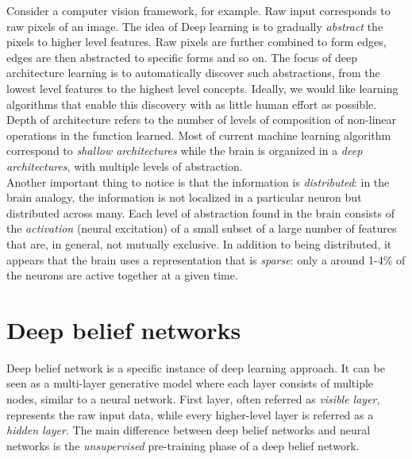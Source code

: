 Consider a computer vision framework, for example. Raw input corresponds to raw pixels of an image. The idea of Deep learning is to gradually \textit{abstract} the pixels to higher level features. Raw pixels are further combined to form edges, edges are then abstracted to specific forms and so on. The focus of deep architecture learning is to automatically discover such abstractions, from the lowest level features to the highest level concepts. Ideally, we would like learning algorithms that enable this discovery with as little human effort as possible. \\

Depth of architecture refers to the number of levels of composition of non-linear operations in the function learned. Most of current machine learning algorithm correspond to \textit{shallow architectures} while the brain is organized in a \textit{deep architectures}, with multiple levels of abstraction. \\

Another important thing to notice is that the information is \textit{distributed}: in the brain analogy, the information is not localized in a particular neuron but distributed across many. Each level of abstraction found in the brain consists of the \textit{activation} (neural excitation) of a small subset of a large number of features that are, in general, not mutually exclusive. In addition to being distributed, it appears that the brain uses a representation that is \textit{sparse}: only a around 1-4\% of the neurons are active together at a given time.


\section{Deep belief networks}

Deep belief network is a specific instance of deep learning approach. It can be seen as a multi-layer generative model where each layer consists of multiple nodes, similar to a neural network. First layer, often referred as \textit{visible layer}, represents the raw input data, while every higher-level layer is referred as a \textit{hidden layer}. The main difference between deep belief networks and neural networks is the \textit{unsupervised} pre-training phase of a deep belief network. \\

